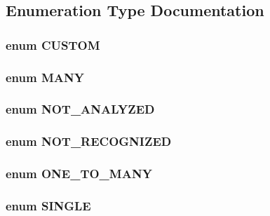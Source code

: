 \subsection{Enumeration Type Documentation}
\hypertarget{db_8php_adb36c4e2bb36018570c94f4e1ad0f19c}{
\subsubsection[{CUSTOM}]{\setlength{\rightskip}{0pt plus 5cm}enum {\bf CUSTOM}}}
\label{db_8php_adb36c4e2bb36018570c94f4e1ad0f19c}
\hypertarget{db_8php_a0146ef09f9a37e6ec7dbd719390f9de4}{
\subsubsection[{MANY}]{\setlength{\rightskip}{0pt plus 5cm}enum {\bf MANY}}}
\label{db_8php_a0146ef09f9a37e6ec7dbd719390f9de4}
\hypertarget{db_8php_ab2ccf7b117b4b822d61c1a3a07a528a2}{
\subsubsection[{NOT\_\-ANALYZED}]{\setlength{\rightskip}{0pt plus 5cm}enum {\bf NOT\_\-ANALYZED}}}
\label{db_8php_ab2ccf7b117b4b822d61c1a3a07a528a2}
\hypertarget{db_8php_a1b965efd4e0428b37a632346f4eef7e1}{
\subsubsection[{NOT\_\-RECOGNIZED}]{\setlength{\rightskip}{0pt plus 5cm}enum {\bf NOT\_\-RECOGNIZED}}}
\label{db_8php_a1b965efd4e0428b37a632346f4eef7e1}
\hypertarget{db_8php_ad2a8019952a8ce0c04e4fb3fbb4fe266}{
\subsubsection[{ONE\_\-TO\_\-MANY}]{\setlength{\rightskip}{0pt plus 5cm}enum {\bf ONE\_\-TO\_\-MANY}}}
\label{db_8php_ad2a8019952a8ce0c04e4fb3fbb4fe266}
\hypertarget{db_8php_a76b06276bbadc1b8d9e716c5d9326919}{
\subsubsection[{SINGLE}]{\setlength{\rightskip}{0pt plus 5cm}enum {\bf SINGLE}}}
\label{db_8php_a76b06276bbadc1b8d9e716c5d9326919}

